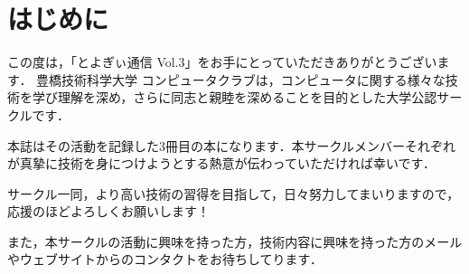 \chapter*{はじめに}
この度は，「とよぎぃ通信 Vol.3」をお手にとっていただきありがとうございます．
豊橋技術科学大学 コンピュータクラブは，コンピュータに関する様々な技術を学び理解を深め，さらに同志と親睦を深めることを目的とした大学公認サークルです．

本誌はその活動を記録した3冊目の本になります．本サークルメンバーそれぞれが真摯に技術を身につけようとする熱意が伝わっていただければ幸いです．

サークル一同，より高い技術の習得を目指して，日々努力してまいりますので，応援のほどよろしくお願いします！

また，本サークルの活動に興味を持った方，技術内容に興味を持った方のメールやウェブサイトからのコンタクトをお待ちしてります．
